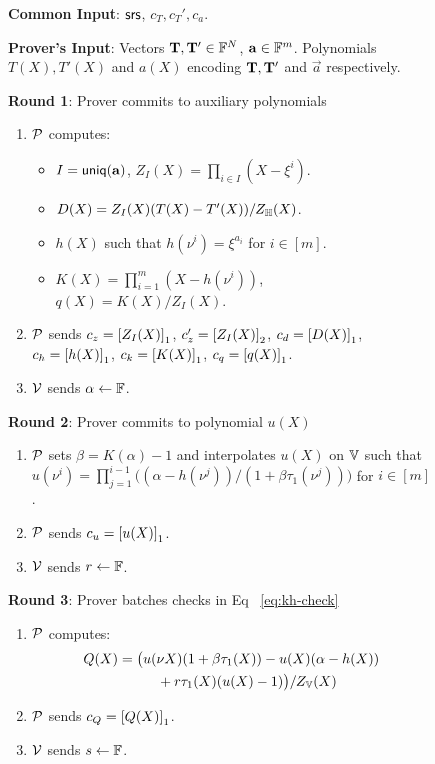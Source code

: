 \begin{figure}[htbp]
    \begin{mdframed}

        {\bf Common Input}: $\mathsf{srs}$, $c_T, c_T', c_a$.

        {\bf Prover's Input}: Vectors $\mathbf{T},\mathbf{T}'\in \mathbb{F}^N$, $\mathbf{a}\in \mathbb{F}^m$. Polynomials $T(X),T'(X)$ and
        $a(X)$ encoding $\mathbf{T},\mathbf{T}'$ and $\vec{a}$ respectively.

        {\bf Round 1}: Prover commits to auxiliary polynomials
        \begin{enumerate}[leftmargin=1em, label=\arabic*.]
            \item $\mathcal{P}$ computes:
                \begin{itemize}[leftmargin=1em, label=-]
                \item $I=\mathsf{uniq}(\mathbf{{a}})$, $Z_I(X)=\prod_{i\in I}(X-\xi^i)$.
                \item $D(X)=Z_I(X)(T(X) - T'(X))/Z_\mathbb{H}(X)$.
                \item $h(X)$ such that $h(\nu^i)=\xi^{a_i}$ for $i\in [m]$.
                \item $K(X)=\prod_{i=1}^m (X - h(\nu^i))$, $q(X)=K(X)/Z_I(X)$.
                \end{itemize}
            \item $\mathcal{P}$ sends $c_z = \left[{Z_I(X)}\right]_1$, $c_z'=\left[{Z_I(X)}\right]_2$, $c_d=\left[{D(X)}\right]_1$, $c_h=\left[{h(X)}\right]_1$, $c_k=\left[{K(X)}\right]_1$,
            $c_q=\left[{q(X)}\right]_1$.
            \item $\mathcal{V}$ sends $\alpha\gets \mathbb{F}$.
        \end{enumerate}

        {\bf Round 2}: Prover commits to polynomial $u(X)$
        \begin{enumerate}[leftmargin=1em, label=\arabic*.]
            \item $\mathcal{P}$ sets $\beta=K(\alpha)-1$ and interpolates $u(X)$ on $\mathbb{V}$ such that
                $u(\nu^i)=\prod_{j=1}^{i-1}\big((\alpha - h(\nu^j))/(1 + \beta\tau_1(\nu^j))\big)$ for $i\in [m]$.
            \item $\mathcal{P}$ sends $c_u=\left[{u(X)}\right]_1$.
            \item $\mathcal{V}$ sends $r\gets \mathbb{F}$.
        \end{enumerate}


        {\bf Round 3}: Prover batches checks in Eq ~\eqref{eq:kh-check}
        \begin{enumerate}[leftmargin=1em, label=\arabic*.]
            \item $\mathcal{P}$ computes:
            \begin{align*}
            Q(X)=\big(&u(\nu X)(1+\beta \tau_1(X)) - u(X)(\alpha - h(X)) \\
            &\quad + r\tau_1(X)(u(X)-1)\big)/Z_{\mathbb{V}}(X)
            \end{align*}
            \item $\mathcal{P}$ sends $c_Q = \left[{Q(X)}\right]_1$.
            \item $\mathcal{V}$ sends $s\gets \mathbb{F}$.
        \end{enumerate}


\end{mdframed}
\end{figure}
